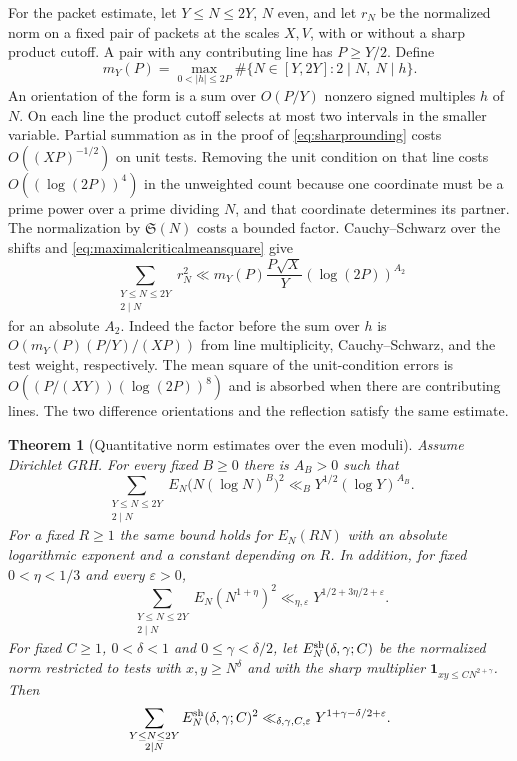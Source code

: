 \documentclass[11pt,a4paper]{article}
\numberwithin{equation}{section}
\newtheorem{theorem}{Theorem}[section]
\newcommand{\SSS}{\mathfrak S}
\begin{document}
For the packet estimate, let $Y\le N\le 2Y$, $N$ even,
and let $r_N$ be the normalized norm on a fixed pair
of packets at the scales $X,V$, with or without a sharp
product cutoff. A pair with any contributing line has
$P\ge Y/2$. Define
\[
 m_Y(P)=\max_{0<|h|\le 2P}
          \#\{N\in[Y,2Y]:2\mid N,\ N\mid h\}.
\]
An orientation of the form is a sum over $O(P/Y)$
nonzero signed multiples $h$ of $N$. On each line the
product cutoff selects at most two intervals in the
smaller variable. Partial summation as in the proof
of \cref{eq:sharprounding} costs $O((XP)^{-1/2})$ on
unit tests. Removing the unit condition on that line
costs $O((\log(2P))^4)$ in the unweighted count because
one coordinate must be a prime power over a prime dividing
$N$, and that coordinate determines its partner.
The normalization by $\SSS(N)$ costs a bounded factor.
Cauchy--Schwarz over the shifts and
\cref{eq:maximalcriticalmeansquare} give
\begin{equation}
 \sum_{\substack{Y\le N\le 2Y\\2\mid N}}r_N^2
 \ll m_Y(P)\frac{P\sqrt X}{Y}(\log(2P))^{A_2}
 \label{eq:quantitativepacketavg}
\end{equation}
for an absolute $A_2$. Indeed the factor before the sum
over $h$ is $O(m_Y(P)(P/Y)/(XP))$ from line multiplicity,
Cauchy--Schwarz, and the test weight, respectively.
The mean square of the unit-condition errors is
$O((P/(XY))(\log(2P))^8)$ and is absorbed when there
are contributing lines. The two difference orientations
and the reflection satisfy the same estimate.

\begin{theorem}[Quantitative norm estimates over the even moduli]
\label{thm:quantitativenormexceptions}
Assume Dirichlet GRH. For every fixed $B\ge0$ there is
$A_B>0$ such that
\begin{equation}
 \sum_{\substack{Y\le N\le2Y\\2\mid N}}
      E_N\bigl(N(\log N)^B\bigr)^2
       \ll_B Y^{1/2}(\log Y)^{A_B}.
 \label{eq:squarerootnormexceptions}
\end{equation}
For a fixed $R\ge1$ the same bound holds for $E_N(RN)$
with an absolute logarithmic exponent and a constant
depending on $R$. In addition, for fixed $0<\eta<1/3$
and every $\varepsilon>0$,
\begin{equation}
 \sum_{\substack{Y\le N\le2Y\\2\mid N}} E_N(N^{1+\eta})^2
      \ll_{\eta,\varepsilon} Y^{1/2+3\eta/2+\varepsilon}.
 \label{eq:quantitativepowerrect}
\end{equation}
For fixed $C\ge1$, $0<\delta<1$ and $0\le\gamma<\delta/2$,
let $E_N^{\rm sh}(\delta,\gamma;C)$ be the normalized
norm restricted to tests with $x,y\ge N^\delta$ and with
the sharp multiplier $\mathbf1_{xy\le CN^{2+\gamma}}$.
Then
\begin{equation}
 \sum_{\substack{Y\le N\le2Y\\2\mid N}}
     E_N^{\rm sh}(\delta,\gamma;C)^2
       \ll_{\delta,\gamma,C,\varepsilon}
                   Y^{1+\gamma-\delta/2+\varepsilon}.
 \label{eq:quantitativepowerproduct}
\end{equation}
\end{theorem}
\end{document}
